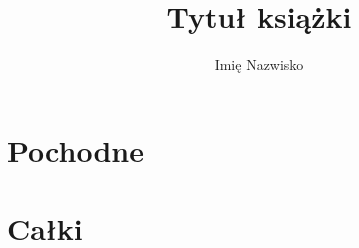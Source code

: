 \documentclass{parchment}
\author{Imię Nazwisko}
\title{Tytuł książki}
\begin{document}






\chapter{Pochodne}


\chapter{Całki}









{}

\end{document}
